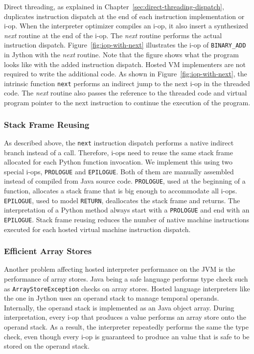 Direct threading, as explained in Chapter~\ref{sec:direct-threading-dispatch}, duplicates instruction dispatch at the end of each instruction implementation or i-op.
When the interpreter optimizer compiles an i-op, it also insert a synthesized \emph{next} routine at the end of the i-op.
The \emph{next} routine performs the actual instruction dispatch.
Figure~\ref{fig:iop-with-next} illustrates the i-op of \texttt{BINARY\_ADD} in Jython with the \emph{next} routine.
Note that the figure shows what the program looks like with the added instruction dispatch.
Hosted VM implementers are not required to write the additional code.
As shown in Figure~\ref{fig:iop-with-next}, the intrinsic function \texttt{next} performs an indirect jump to the next i-op in the threaded code.
The \emph{next} routine also passes the reference to the threaded code and virtual program pointer to the next instruction to continue the execution of the program.

\subsubsection{Stack Frame Reusing}

As described above, the \texttt{next} instruction dispatch performs a native indirect branch instead of a call.
Therefore, i-ops need to reuse the same stack frame allocated for each Python function invocation.
We implement this using two special i-ops, \texttt{PROLOGUE} and \texttt{EPILOGUE}.
Both of them are manually assembled instead of compiled from Java source code.
\texttt{PROLOGUE}, used at the beginning of a function, allocates a stack frame that is big enough to accommodate all i-ops.
\texttt{EPILOGUE}, used to model \texttt{RETURN}, deallocates the stack frame and returns.
The interpretation of a Python method always start with a \texttt{PROLOGUE} and end with an \texttt{EPILOGUE}.
Stack frame reusing reduces the number of native machine instructions executed for each hosted virtual machine instruction dispatch.

\subsubsection{Efficient Array Stores}
\label{sec:efficient-array-stores}

Another problem affecting hosted interpreter performance on the JVM is the performance of array stores.
Java being a safe language performs type check such as \texttt{ArrayStoreException} checks on array stores.
Hosted language interpreters like the one in Jython uses an operand stack to manage temporal operands.
Internally, the operand stack is implemented as an Java object array.
During interpretation, every i-op that produces a value performs an array store onto the operand stack.
As a result, the interpreter repeatedly performs the same the type check, even though every i-op is guaranteed to produce an value that is safe to be stored on the operand stack.

